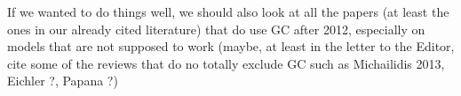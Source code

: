\documentclass[a4paper,10pt]{article}
\begin{document}





If we wanted to do things well, we should also look at all the papers (at least the ones in our already cited literature) that do use GC after 2012, especially on models that are not supposed to work (maybe, at least in the letter to the Editor, cite some of the reviews that do no totally exclude GC such as Michailidis 2013, Eichler ?, Papana ?)
\end{document}
